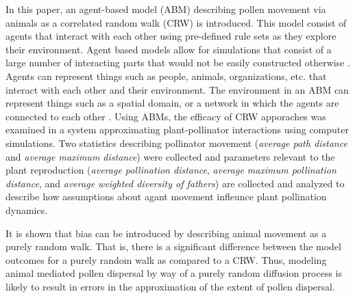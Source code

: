 In this paper, an agent-based model (ABM) describing pollen movement via animals as a correlated 
random walk (CRW) is introduced. This model consist of agents that interact with each other using 
pre-defined rule sets as they explore their environment. Agent based models allow for simulations 
that consist of a large number of interacting parts that would not be easily constructed otherwise 
\cite{Fioretti05}. Agents can represent things such as people, animals, organizations, etc. that 
interact with each other and their environment. The environment in an ABM can represent things 
such as a spatial domain, or a network in which the agents are connected to each other 
\cite{Gilbert}. Using ABMs, the efficacy of CRW apporaches was examined in a system approximating
plant-pollinator interactions using computer simulations. Two statistics describing pollinator movement
(\emph{average path distance} and \emph{average maximum distance}) were collected and parameters relevant
to the plant reproduction (\emph{average pollination distance}, \emph{average maximum
pollination distance}, and \emph{average weighted diversity of fathers}) are collected and analyzed to
describe how assumptions about agant movement infleunce plant pollination dynamics.

It is shown that bias can be introduced by describing animal movement as a purely random walk. That
is, there is a significant difference between the model outcomes for a purely random walk as
compared to a CRW. Thus, modeling animal mediated pollen dispersal by way of a purely random
diffusion process is likely to result in errors in the approximation of the extent of pollen
dispersal.
